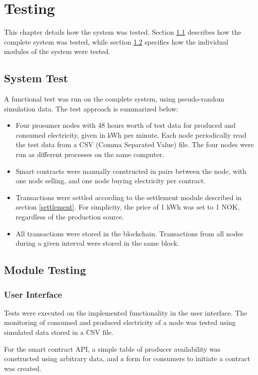 \chapter{Testing}\label{test}
This chapter details how the system was tested. Section \ref{system} describes how the complete system was tested, while section \ref{moduletest} specifies how the individual modules of the system were tested.

\section{System Test} \label{system}
A functional test was run on the complete system, using pseudo-random simulation data. The test approach is summarized below:
\begin{itemize}
\item Four prosumer nodes with 48 hours worth of test data for produced and consumed electricity, given in kWh per minute. Each node periodically read the test data from a CSV (Comma Separated Value) file. The four nodes were run as different processes on the same computer. 
\item Smart contracts were manually constructed in pairs between the node, with one node selling, and one node buying electricity per contract.
\item Transactions were settled according to the settlement module described in section \ref{settlement}. For simplicity, the price of 1 kWh was set to 1 NOK, regardless of the production source.
\item All transactions were stored in the blockchain. Transactions from all nodes during a given interval were stored in the same block. 
\end{itemize}

\section{Module Testing} \label{moduletest}
\subsection{User Interface}

Tests were executed on the implemented functionality in the user interface. 
The monitoring of consumed and produced electricity of a node was tested using simulated data stored in a CSV file. 

For the smart contract API, a simple table of producer availability was constructed using arbitrary data, and a form for consumers to initiate a contract was created.  
 
